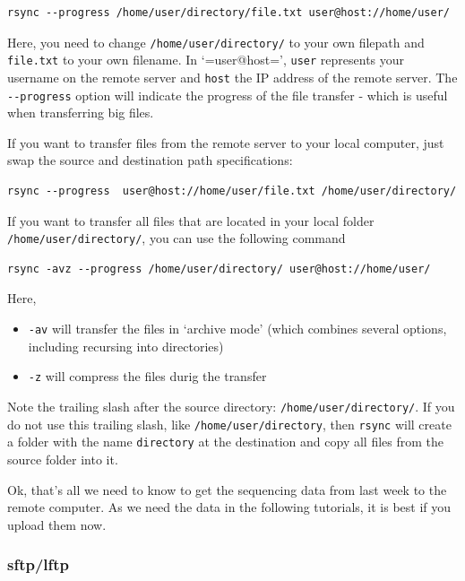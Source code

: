 \documentclass[11pt]{article}
\begin{document}
\begin{verbatim}
rsync --progress /home/user/directory/file.txt user@host://home/user/
\end{verbatim}

 Here, you need to change \texttt{/home/user/directory/} to your own filepath and
 \texttt{file.txt} to your own filename. In `=user@host=', \texttt{user}
 represents your username on the remote server and \texttt{host} the IP
 address of the remote server.  The \texttt{-{}-progress} option will indicate
 the progress of the file transfer - which is useful when transferring
 big files.

 If you want to transfer files from the remote server to your
 local computer, just swap the source and destination path
 specifications:


\begin{verbatim}
rsync --progress  user@host://home/user/file.txt /home/user/directory/
\end{verbatim}

 If you want to transfer all files that are located in your local
 folder \texttt{/home/user/directory/}, you can use the following command


\begin{verbatim}
rsync -avz --progress /home/user/directory/ user@host://home/user/
\end{verbatim}

 Here,
\begin{itemize}
\item \texttt{-av} will transfer the files in `archive mode' (which combines
   several options, including recursing into directories)
\item \texttt{-z} will compress the files durig the transfer
\end{itemize}

 Note the trailing slash after the source directory:
 \texttt{/home/user/directory/}. If you do not use this trailing slash, like
 \texttt{/home/user/directory}, then \texttt{rsync} will create a folder with the
 name \texttt{directory} at the destination and copy all files from the source
 folder into it.


Ok, that's all we need to know to get the sequencing data from last
week to the remote computer. As we need the data in the following
tutorials, it is best if you upload them now.
 
\subsubsection{sftp/lftp}
\label{sec-2-2-2}
\end{document}
